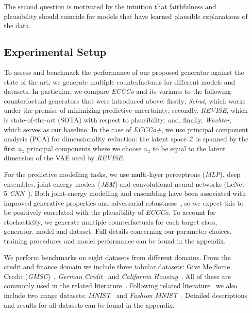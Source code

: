 The second question is motivated by the intuition that faithfulness and plausibility should coincide for models that have learned plausible explanations of the data.

\subsection{Experimental Setup}\label{emp:setup}

To assess and benchmark the performance of our proposed generator against the state of the art, we generate multiple counterfactuals for different models and datasets. In particular, we compare \textit{ECCCo} and its variants to the following counterfactual generators that were introduced above: firstly; \textit{Schut}, which works under the premise of minimizing predictive uncertainty; secondly, \textit{REVISE}, which is state-of-the-art (SOTA) with respect to plausibility; and, finally, \textit{Wachter}, which serves as our baseline. In the case of \textit{ECCCo+}, we use principal component analysis (PCA) for dimensionality reduction: the latent space $\mathcal{Z}$ is spanned by the first $n_z$ principal components where we choose $n_z$ to be equal to the latent dimension of the VAE used by \textit{REVISE}.

For the predictive modelling tasks, we use multi-layer perceptrons (\textit{MLP}), deep ensembles, joint energy models (\textit{JEM}) and convolutional neural networks (LeNet-5 \textit{CNN}~\citep{lecun1998gradient}). Both joint-energy modelling and ensembling have been associated with improved generative properties and adversarial robustness~\citep{grathwohl2020your,lakshminarayanan2016simple}, so we expect this to be positively correlated with the plausibility of \textit{ECCCo}. To account for stochasticity, we generate multiple counterfactuals for each target class, generator, model and dataset. Full details concerning our parameter choices, training procedures and model performance can be found in the appendix.

We perform benchmarks on eight datasets from different domains. From the credit and finance domain we include three tabular datasets: Give Me Some Credit (\textit{GMSC})~\citep{kaggle2011give}, \textit{German Credit}~\citet{hoffman1994german} and \textit{California Housing}~\citet{pace1997sparse}. All of these are commonly used in the related literature~\citep{karimi2020survey,altmeyer2023endogenous,pawelczyk2021carla}. Following related literature~\citep{schut2021generating,dhurandhar2018explanations} we also include two image datasets: \textit{MNIST}~\citep{lecun1998mnist} and \textit{Fashion MNIST}~\citep{xiao2017fashion}. Detailed descriptions and results for all datasets can be found in the appendix. 

